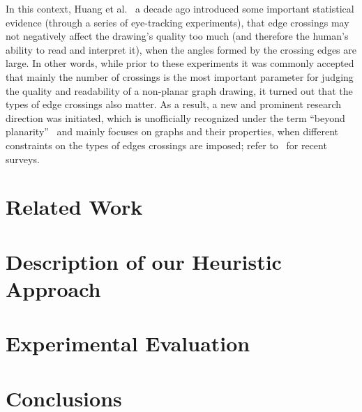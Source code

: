 \documentclass{llncs}
\begin{document}
In this context, Huang et al.~\cite{DBLP:conf/apvis/Huang07,DBLP:journals/vlc/HuangEH14} a decade ago introduced some important statistical evidence (through a series of eye-tracking experiments), that edge crossings may not negatively affect the drawing's quality too much (and therefore the human's ability to read and interpret it), when the angles formed by the crossing edges are large. In other words, while prior to these experiments it was commonly accepted that mainly the number of crossings is the most important parameter for judging the quality and readability of a non-planar graph drawing, it turned out that the types of edge crossings also matter. As a result, a new and prominent research direction was initiated, which is unofficially recognized under the term ``beyond planarity''~\cite{Shonan2016,Dagstuhl2016,SoCG2017} and mainly focuses on graphs and their properties, when different constraints on the types of edges crossings are imposed; refer to~\cite{DBLP:journals/jgaa/BekosKM18,DBLP:journals/corr/abs-1804-07257} for recent surveys. 



\section{Related Work}
\label{sec:relatedwork}


\section{Description of our Heuristic Approach}
\label{sec:algorithm}


\section{Experimental Evaluation}
\label{sec:experiments}


\section{Conclusions}
\label{sec:conclusions}



\end{document}
